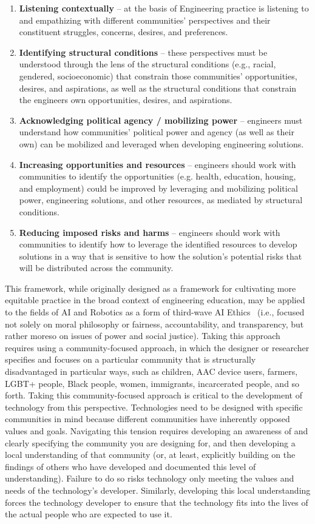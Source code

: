\documentclass[letterpaper]{article} %
\begin{document}
\begin{enumerate}
\item \textbf{Listening contextually} -- at the basis of Engineering practice is listening to and empathizing with different communities' perspectives and their constituent struggles, concerns, desires, and preferences.
\item \textbf{Identifying structural conditions} -- these perspectives must be understood through the lens of the structural conditions (e.g., racial, gendered, socioeconomic) that constrain those communities' opportunities, desires, and aspirations, as well as the structural conditions that constrain the engineers own opportunities, desires, and aspirations.
\item \textbf{Acknowledging political agency / mobilizing power} -- engineers must understand how communities' political power and agency (as well as their own) can be mobilized and leveraged when developing engineering solutions.
\item \textbf{Increasing opportunities and resources} -- engineers should work with communities to identify the opportunities (e.g. health, education, housing, and employment) could be improved by leveraging and mobilizing political power, engineering solutions, and other resources, as mediated by structural conditions.
\item \textbf{Reducing imposed risks and harms} -- engineers should work with communities to identify how to leverage the identified resources to develop solutions in a way that is sensitive to how the solution's potential risks that will be distributed across the community.
\end{enumerate}

This framework, while originally designed as a framework for cultivating more equitable practice in the broad context of engineering education, may be applied to the fields of AI and Robotics as a form of third-wave AI Ethics~\cite{bennett2020point,le2020we} (i.e., focused not solely on moral philosophy or fairness, accountability, and transparency, but rather moreso on issues of power and social justice). Taking this approach requires using a community-focused approach, in which the designer or researcher specifies and focuses on a particular community that is structurally disadvantaged in particular ways, such as children, AAC device users, farmers, LGBT+ people, Black people, women, immigrants, incarcerated people, and so forth. Taking this community-focused approach is critical to the development of technology from this perspective. Technologies need to be designed with specific communities in mind because different communities have inherently opposed values and goals. Navigating this tension requires developing an awareness of and clearly specifying the community you are designing for, and then developing a local understanding of that community (or, at least, explicitly building on the findings of others who have developed and documented this level of understanding). Failure to do so risks technology only meeting the values and needs of the technology's developer. Similarly, developing this local understanding forces the technology developer to ensure that the technology fits into the lives of the actual people who are expected to use it.
\end{document}
